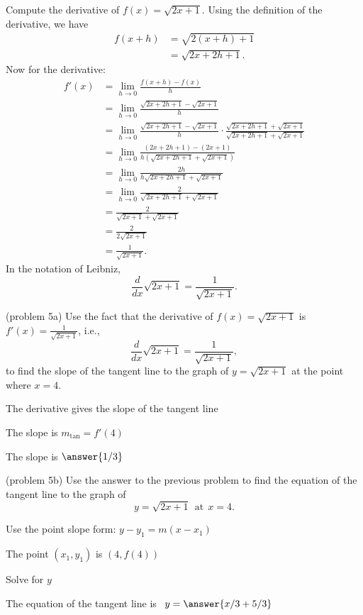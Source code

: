 \documentclass[handout]{ximera}
\begin{document}
\begin{example}[example 5]
Compute the derivative of  $f(x) = \sqrt{2x+1}$.
Using the definition of the derivative, we have
\begin{align*}
f(x+h) &= \sqrt{2(x+h)+1} \\
       &= \sqrt{2x +2h+1}.			
\end{align*}
Now for the derivative:
\begin{align*}
f'(x) &= \lim_{h \to 0} \frac{f(x+h)-f(x)}{h}\\[5pt]
&= \lim_{h \to 0} \frac{\sqrt{2x+2h+1}- \sqrt{2x+1}}{h}\\[5pt]
&= \lim_{h \to 0} \frac{\sqrt{2x+2h+1}- \sqrt{2x+1}}{h} \cdot
\frac{\sqrt{2x+2h+1}+ \sqrt{2x+1}}{\sqrt{2x+2h+1}+ \sqrt{2x+1}} \\[5pt]
&= \lim_{h \to 0} \frac{(2x+2h+1) - (2x+1)}{h(\sqrt{2x+2h+1}+ \sqrt{2x+1})}\\[5pt]
&= \lim_{h \to 0} \frac{2h}{h\sqrt{2x+2h+1}+ \sqrt{2x+1}}\\[5pt]
&= \lim_{h \to 0} \frac{2}{\sqrt{2x+2h+1}+ \sqrt{2x+1}}\\[5pt]
&=  \frac{2}{\sqrt{2x+1}+ \sqrt{2x+1}}\\[5pt]
&=  \frac{2}{2\sqrt{2x+1}}\\[5pt]
&=  \displaystyle{\frac{1}{\sqrt{2x+1}}}.
\end{align*}
In the notation of Leibniz, 
\[
\frac{d}{dx}\sqrt{2x+1}= \frac{1}{\sqrt{2x+1}}.
\]

\end{example}





\begin{problem}(problem 5a)
Use the fact that the derivative of $f(x) = \sqrt{2x+1}$ is $f'(x) = \frac{1}{\sqrt{2x+1}}$,
i.e., 
\[
\frac{d}{dx}\sqrt{2x+1} = \frac{1}{\sqrt{2x+1}},
\]
to find the slope of the tangent line to the graph of 
$y = \sqrt{2x+1}$ at the point where $x = 4$.\\
\begin{hint}
The derivative gives the slope of the tangent line
\end{hint}
\begin{hint}
The slope is $m_{\text{tan}} = f'(4)$
\end{hint}
The slope is $\answer{1/3}$
\end{problem}





\begin{problem}(problem 5b)
Use the answer to the previous problem to find the equation of the tangent line to the graph of 
\[
y = \sqrt{2x+1} \ \ \text{at} \ \ x=4.
\]
\begin{hint}
Use the point slope form: $y-y_1 = m(x-x_1)$
\end{hint}
\begin{hint}
The point $(x_1,y_1)$ is $(4, f(4))$
\end{hint}
\begin{hint}
Solve for $y$
\end{hint}
The equation of the tangent line is \ $y = \answer{x/3 + 5/3}$
\end{problem}
\end{document}
